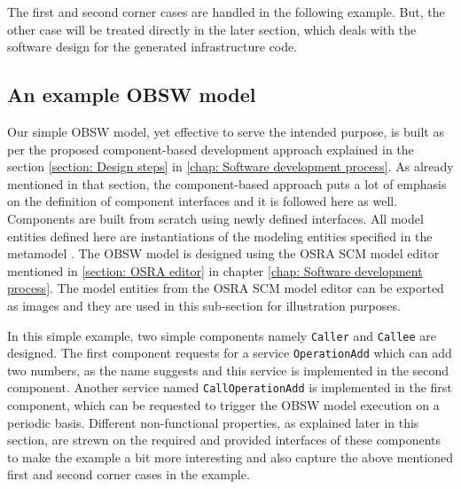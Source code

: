 The first and second corner cases are handled in the following example. But, the other case will be treated directly in the later section, which deals with the software design for the generated infrastructure code. 

\subsection{An example OBSW model}
Our simple OBSW model, yet effective to serve the intended purpose, is built as per the proposed component-based development approach explained in the section \cref{section: Design steps} in \cref{chap: Software development process}. As already mentioned in that section, the component-based approach puts a lot of emphasis on the definition of component interfaces \cite{CompBasedProcess} and it is followed here as well. Components are built from scratch using newly defined interfaces. All model entities defined here are instantiations of the modeling entities specified in the metamodel \cite{SpecMetamodel}. The OBSW model is designed using the OSRA SCM model editor mentioned in \cref{section: OSRA editor} in chapter \cref{chap: Software development process}. The model entities from the OSRA SCM model editor can be exported as images and they are used in this sub-section for illustration purposes.

In this simple example, two simple components namely \texttt{Caller} and \texttt{Callee} are designed. The first component requests for a service \texttt{OperationAdd} which can add two numbers, as the name suggests and this service is implemented in the second component. Another service named \texttt{Call\allowbreak Operation\allowbreak Add} is implemented in the first component, which can be requested to trigger the OBSW model execution on a periodic basis. Different non-functional properties, as explained later in this section, are strewn on the required and provided interfaces of these components to make the example a bit more interesting and also capture the above mentioned first and second corner cases in the example.

